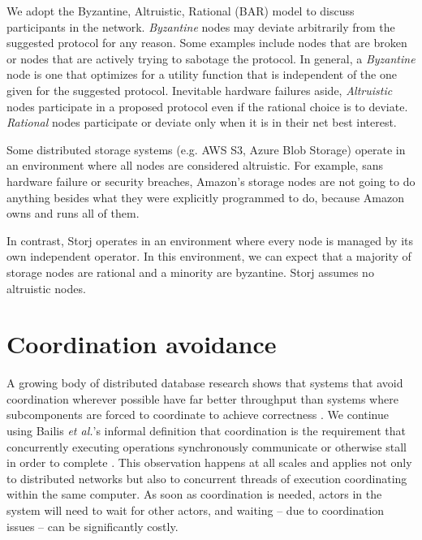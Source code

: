 \documentclass[11pt,fleqn,openany]{book}
\begin{document}
We adopt the Byzantine, Altruistic, Rational (BAR) model \cite{bar} to discuss
participants in the network.
{\em Byzantine} nodes may deviate arbitrarily from the suggested protocol for
any reason. Some examples include nodes that are broken or nodes that
are actively trying to sabotage the protocol. In general, a \textit{Byzantine} node is
one that optimizes for a utility function that is independent of the one
given for the suggested protocol.
Inevitable hardware failures aside, {\em Altruistic} nodes
participate in a proposed protocol even if the rational choice is to deviate.
{\em Rational} nodes participate or deviate only when it
is in their net best interest.

Some distributed storage systems (e.g. AWS S3, Azure Blob Storage)
operate in an environment
where all nodes are considered altruistic. For example, sans hardware failure
or security breaches, Amazon's storage nodes
are not going to do anything besides what they were explicitly programmed to do,
because Amazon owns and runs all of them.

In contrast, Storj operates in an environment where every node is
managed by its own independent operator.
In this environment, we can expect that a majority
of storage nodes are rational and a minority are byzantine. Storj assumes no
altruistic nodes.

\section{Coordination avoidance}\label{sec:coordination-avoidance}

A growing body of distributed database research shows that systems that
avoid coordination wherever possible have far better throughput than systems
where subcomponents are forced to coordinate to achieve correctness
\cite{cap1, cap2, consistency-vs-latency, hat, i-confluence, anna,
calm1, calm2}.
We continue using Bailis {\em et al.}'s informal definition
that coordination is the requirement that concurrently executing operations
synchronously communicate or otherwise stall in order to complete
\cite{i-confluence}.
This observation happens at all scales and applies not only to distributed
networks but also to
concurrent threads of execution coordinating within the same computer.
As soon as coordination is needed, actors in the system will need to wait for
other actors, and waiting -- due to coordination issues -- can be significantly
costly.
\end{document}
